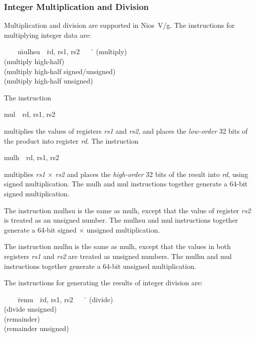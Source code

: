 \documentclass[11pt, twoside, pdftex]{article}
\newenvironment{ctabbing}%
{\begin{center}\begin{minipage}{\textwidth}\begin{tabbing}}
{\end{tabbing}\end{minipage}\end{center}}
\begin{document}
\subsubsection{Integer Multiplication and Division}

Multiplication and division are supported in Nios~V/g. The instructions for multiplying 
integer data are:
\vspace{-\baselineskip}
\begin{ctabbing}
~~~~\={\sf mulhsu}~~\={\sf rd, rs1, rs2}~~~~\=\kill
{} \>(multiply)\\
 \>(multiply high-half)\\
 \>(multiply high-half signed/unsigned)\\
 \>(multiply high-half unsigned)
\end{ctabbing}

\noindent
The instruction
\vspace{-\baselineskip}
\begin{center}
{\sf mul~~rd, rs1, rs2}
\end{center}
\noindent
multiplies the values of registers {\it rs1} and {\it rs2}, and places the {\it low-order}
32 bits of the product into register {\it rd}.  The instruction
\vspace{-\baselineskip}
\begin{center}
{\sf mulh~~rd, rs1, rs2}
\end{center}
\noindent
multiplies {\it rs1} $\times$ {\it rs2} and places the {\it high-order} 32 bits of the result 
into {\it rd}, using signed multiplication. The {\sf mulh} and {\sf mul} instructions
together generate a 64-bit signed multiplication.
 
The instruction {\sf mulhsu} is the same as {\sf mulh}, except that the value of register
{\it rs2} is treated as an unsigned number.  The {\sf mulhsu} and {\sf mul} instructions 
together generate a 64-bit signed $\times$ unsigned multiplication.
 
The instruction {\sf mulhu} is the same as {\sf mulh}, except that the values in both
registers {\it rs1} and {\it rs2} are treated as unsigned numbers.  The {\sf mulhu} and
{\sf mul} instructions together generate a 64-bit unsigned multiplication.

\newpage
The instructions for generating the results of integer division are:
\vspace{-\baselineskip}
\begin{ctabbing}
~~~~\={\sf remu}~~\={\sf rd, rs1, rs2}~~~~\=\kill
{} \>(divide)\\
 \>(divide unsigned)\\
 \>(remainder)\\
 \>(remainder unsigned)
\end{ctabbing}
\end{document}
